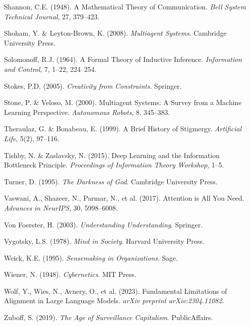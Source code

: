 \documentclass[12pt]{article}
\begin{document}
\begin{thebibliography}{99}
Shannon, C.E. (1948). A Mathematical Theory of Communication. \textit{Bell System Technical Journal}, 27, 379–423.

Shoham, Y. \& Leyton-Brown, K. (2008). \textit{Multiagent Systems}. Cambridge University Press.

Solomonoff, R.J. (1964). A Formal Theory of Inductive Inference. \textit{Information and Control}, 7, 1–22, 224–254.

Stokes, P.D. (2005). \textit{Creativity from Constraints}. Springer.

Stone, P. \& Veloso, M. (2000). Multiagent Systems: A Survey from a Machine Learning Perspective. \textit{Autonomous Robots}, 8, 345–383.

Theraulaz, G. \& Bonabeau, E. (1999). A Brief History of Stigmergy. \textit{Artificial Life}, 5(2), 97–116.

Tishby, N. \& Zaslavsky, N. (2015). Deep Learning and the Information Bottleneck Principle. \textit{Proceedings of Information Theory Workshop}, 1–5.

Turner, D. (1995). \textit{The Darkness of God}. Cambridge University Press.

Vaswani, A., Shazeer, N., Parmar, N., et al. (2017). Attention is All You Need. \textit{Advances in NeurIPS}, 30, 5998–6008.

Von Foerster, H. (2003). \textit{Understanding Understanding}. Springer.

Vygotsky, L.S. (1978). \textit{Mind in Society}. Harvard University Press.

Weick, K.E. (1995). \textit{Sensemaking in Organizations}. Sage.

Wiener, N. (1948). \textit{Cybernetics}. MIT Press.

Wolf, Y., Wies, N., Avnery, O., et al. (2023). Fundamental Limitations of Alignment in Large Language Models. \textit{arXiv preprint arXiv:2304.11082}.

Zuboff, S. (2019). \textit{The Age of Surveillance Capitalism}. PublicAffairs.

\end{thebibliography}
\end{document}
